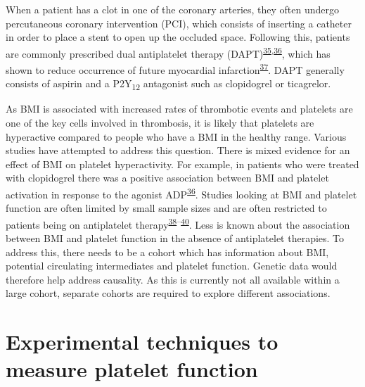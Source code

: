 \documentclass[11pt,twoside]{bristolthesis}
\begin{document}
When a patient has a clot in one of the coronary arteries, they often undergo percutaneous coronary intervention (PCI), which consists of inserting a catheter in order to place a stent to open up the occluded space. Following this, patients are commonly prescribed dual antiplatelet therapy (DAPT)\textsuperscript{\protect\hyperlink{ref-Freynhofer2017a}{35},\protect\hyperlink{ref-Nardin2015}{36}}, which has shown to reduce occurrence of future myocardial infarction\textsuperscript{\protect\hyperlink{ref-Khan2020}{37}}. DAPT generally consists of aspirin and a P2Y\textsubscript{12} antagonist such as clopidogrel or ticagrelor.

As BMI is associated with increased rates of thrombotic events and platelets are one of the key cells involved in thrombosis, it is likely that platelets are hyperactive compared to people who have a BMI in the healthy range. Various studies have attempted to address this question. There is mixed evidence for an effect of BMI on platelet hyperactivity. For example, in patients who were treated with clopidogrel there was a positive association between BMI and platelet activation in response to the agonist ADP\textsuperscript{\protect\hyperlink{ref-Nardin2015}{36}}. Studies looking at BMI and platelet function are often limited by small sample sizes and are often restricted to patients being on antiplatelet therapy\textsuperscript{\protect\hyperlink{ref-Deharo2014}{38}--\protect\hyperlink{ref-Pankert2014}{40}}. Less is known about the association between BMI and platelet function in the absence of antiplatelet therapies. To address this, there needs to be a cohort which has information about BMI, potential circulating intermediates and platelet function. Genetic data would therefore help address causality. As this is currently not all available within a large cohort, separate cohorts are required to explore different associations.

\hypertarget{platelet-function-techniques}{%
\section{Experimental techniques to measure platelet function}\label{platelet-function-techniques}}
\end{document}
